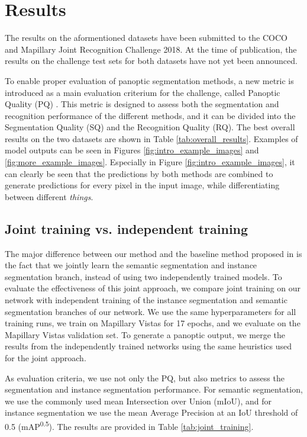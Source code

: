 \documentclass[10pt,twocolumn,letterpaper]{article}
\begin{document}
\section{Results}

The results on the aformentioned datasets have been submitted to the COCO and Mapillary Joint Recognition Challenge 2018. At the time of publication, the results on the challenge test sets for both datasets have not yet been announced.

To enable proper evaluation of panoptic segmentation methods, a new metric is introduced as a main evaluation criterium for the challenge, called Panoptic Quality (PQ) \cite{Kirillov2018}. This metric is designed to assess both the segmentation and recognition performance of the different methods, and it can be divided into the Segmentation Quality (SQ) and the Recognition Quality (RQ). The best overall results on the two datasets are shown in Table \ref{tab:overall_results}. Examples of model outputs can be seen in Figures \ref{fig:intro_example_images} and \ref{fig:more_example_images}. Especially in Figure \ref{fig:intro_example_images}, it can clearly be seen that the predictions by both methods are combined to generate predictions for every pixel in the input image, while differentiating between different \textit{things}.


\subsection{Joint training vs. independent training}
\label{sec:joint_training}
The major difference between our method and the baseline method proposed in \cite{Kirillov2018} is the fact that we jointly learn the semantic segmentation and instance segmentation branch, instead of using two independently trained models. To evaluate the effectiveness of this joint approach, we compare joint training on our network with independent training of the instance segmentation and semantic segmentation branches of our network. We use the same hyperparameters for all training runs, we train on Mapillary Vistas for 17 epochs, and we evaluate on the Mapillary Vistas validation set. To generate a panoptic output, we merge the results from the independently trained networks using the same heuristics used for the joint approach.

As evaluation criteria, we use not only the PQ, but also metrics to assess the segmentation and instance segmentation performance. For semantic segmentation, we use the commonly used mean Intersection over Union (mIoU), and for instance segmentation we use the mean Average Precision at an IoU threshold of 0.5 (mAP\textsuperscript{0.5}). The results are provided in Table \ref{tab:joint_training}.
\end{document}
